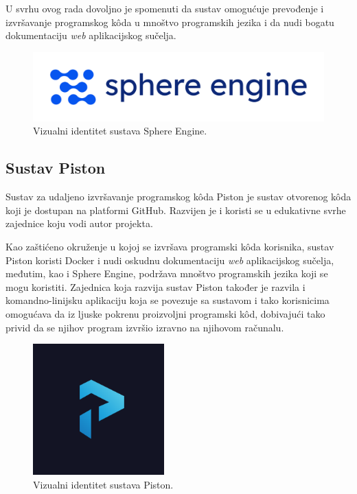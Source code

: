 \documentclass[times, utf8, diplomski]{fer}
\begin{document}
U svrhu ovog rada dovoljno je spomenuti da sustav omogućuje prevođenje i izvršavanje programskog kôda u mnoštvo programskih jezika i da nudi bogatu dokumentaciju \textit{web} aplikacijskog sučelja.

\begin{figure}[htb]
	\centering
	\includegraphics[width=\textwidth]{images/Sphere Engine Logo.png}
	\caption{
	    Vizualni identitet sustava Sphere Engine. \citep{SphereEngine}
	}
\end{figure}

\pagebreak

\subsection{Sustav Piston}
Sustav za udaljeno izvršavanje programskog kôda Piston \citep{Piston} je sustav otvorenog kôda koji je dostupan na platformi GitHub. Razvijen je i koristi se u edukativne svrhe zajednice koju vodi autor projekta.

Kao zaštićeno okruženje u kojoj se izvršava programski kôda korisnika, sustav Piston koristi Docker i nudi oskudnu dokumentaciju \textit{web} aplikacijskog sučelja, međutim, kao i Sphere Engine, podržava mnoštvo programskih jezika koji se mogu koristiti. Zajednica koja razvija sustav Piston također je razvila i komandno-linijsku aplikaciju koja se povezuje sa sustavom i tako korisnicima omogućava da iz ljuske  pokrenu proizvoljni programski kôd, dobivajući tako privid da se njihov program izvršio izravno na njihovom računalu.

\begin{figure}[htb]
	\centering
	\includegraphics[width=0.45\textwidth]{images/Piston Logo.png}
	\caption{
	    Vizualni identitet sustava Piston. \citep{Piston}
	}
\end{figure}
\end{document}
